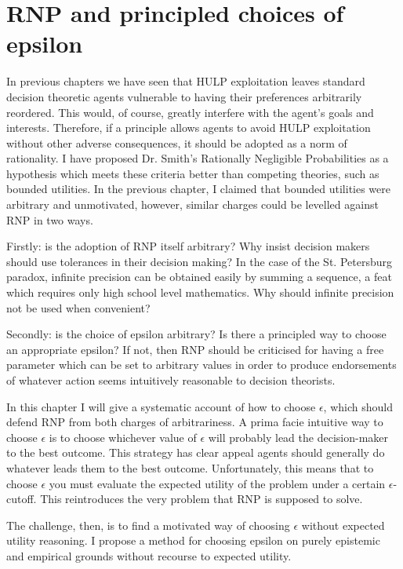 \documentclass{article}
\begin{document}
\newpage\section{RNP and principled choices of epsilon}

In previous chapters we have seen that HULP exploitation leaves standard decision theoretic agents vulnerable to having their preferences arbitrarily reordered. This would, of course, greatly interfere with the agent's goals and interests. Therefore, if a principle allows agents to avoid HULP exploitation without other adverse consequences, it should be adopted as a norm of rationality. I have proposed Dr. Smith's Rationally Negligible Probabilities as a hypothesis which meets these criteria better than competing theories, such as bounded utilities. In the previous chapter, I claimed that bounded utilities were arbitrary and unmotivated, however, similar charges could be levelled against RNP in two ways.

Firstly: is the adoption of RNP itself arbitrary? Why insist decision makers should use tolerances in their decision making? In the case of the St. Petersburg paradox, infinite precision can be obtained easily by summing a sequence, a feat which requires only high school level mathematics. Why should infinite precision not be used when convenient?

Secondly: is the choice of epsilon arbitrary? Is there a principled way to choose an appropriate epsilon? If not, then RNP should be criticised for having a free parameter which can be set to arbitrary values in order to produce endorsements of whatever action seems intuitively reasonable to decision theorists. 

In this chapter I will give a systematic account of how to choose \(\epsilon\), which should defend RNP from both charges of arbitrariness. A prima facie intuitive way to choose \(\epsilon\) is to choose whichever value of \(\epsilon\) will probably lead the decision-maker to the best outcome. This strategy has clear appeal \textemdash{} agents should generally do whatever leads them to the best outcome. Unfortunately, this means that to choose \(\epsilon\) you must evaluate the expected utility of the problem under a certain \(\epsilon\)-cutoff. This reintroduces the very problem that RNP is supposed to solve. 

The challenge, then, is to find a motivated way of choosing \(\epsilon\) without expected utility reasoning. I propose a method for choosing epsilon on purely epistemic and empirical grounds without recourse to expected utility. 
\end{document}

